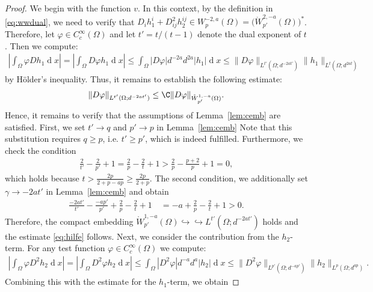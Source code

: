 \documentclass[12pt,a4paper,twoside]{article}
\newcommand{\diff}{\operatorname{d}\!}
\newcommand {\cb}[1] {\tikz[baseline=(char.base)]{
            \node[shape=circle,draw,inner sep=2pt] (char) {\itshape{\textbf{#1}}};}}
\newcommand {\cbm}[1] {\tikz[baseline=(char.base)]{
            \node[shape=circle,draw,inner sep=2pt] (char) {\scriptsize\itshape{\textbf{#1}}};}}
\begin{document}
\begin{proof}
\noindent\cb{1}
We begin with the function $v$.  In this context, by the definition in \eqref{eq:wwdual}, we need to verify that $D_ih^i_1+D^2_{ij}h^{ij}_2\in W^{-2,a}_p(\Omega)=\big(\mathring W^{2,-a}_{p'}(\Omega)\big)^\ast$. Therefore, let $\varphi\in C^\infty_c(\Omega)$ and let $t'=t/(t-1)$ denote the dual exponent of $t$. Then we compute:
\begin{align*}
 \left|\int_\Omega \varphi D h_1 \diff x\right|=  \left| \int_\Omega D \varphi h_1 \diff x \right|
 \le
 \int_\Omega |D \varphi| d^{- 2a } d^{2a} |h_1| \diff x 
    \le \|D \varphi  \|_{L^{t'}(\Omega; d^{-2at' })}  \| h_1  \|_{L^t(\Omega; d^{2at}) }
\end{align*}
by Hölder's inequality. Thus, it remains to establish the following estimate:
\begin{align}
    \|D \varphi  \|_{L^{t'}(\Omega; d^{-2at' })} \le  \C \|D \varphi  \|_{\mathring W^{1,-a}_{p'}(\Omega)}. \label{eq:hilfe}
\end{align}
Hence, it remains to verify that the assumptions of Lemma~\ref{lem:cemb} \cbm b are satisfied. First, we set $t'\to q$ and $p'\to p$ in Lemma~\ref{lem:cemb} \cbm b Note that this substitution requires $q\ge p$, i.e. $t' \ge p'$, which is indeed fulfilled.
Furthermore, we check the condition
\begin{align*}
    \frac{2}{t'}-\frac{2}{p'}+1 = \frac{2}{p}- \frac{2}{t} +1 > \frac{2}{p}-\frac{p+2}{p} +1 =0,
\end{align*}
which holds because $t>\frac{2p}{2+p-ap}\ge \frac{2p}{2+p} $. 
The second condition, we additionally set $\gamma\to -2at'$   in Lemma~\ref{lem:cemb} \cbm b and obtain
\begin{align*}
    \frac{-2at'}{t'}- \frac{-ap'}{p'}+ \frac{2}{p}- \frac{2}{t} +1 
    &\ = -a +\frac{2}{p}- \frac{2}{t} +1 > 0.
\end{align*}
Therefore, the compact embedding ${\mathring W^{1,-a}_{p'}(\Omega)}
 \hookrightarrow\hookrightarrow{L^{t'}(\Omega; d^{-2at' })}$ holds and the estimate \eqref{eq:hilfe} follows.  
Next, we consider the contribution from the $h_2$-term.  For any test function $\varphi\in C^\infty_c(\Omega)$ we compute:
\begin{align*}
 \left|\int_\Omega \varphi D^2 h_2 \diff x\right|=  \left| \int_\Omega D^2 \varphi h_2  \diff x \right|
 \le
 \int_\Omega |D^2 \varphi| d^{- a} d^{a} |h_2| \diff x 
    \le \|D^2 \varphi  \|_{L^{p'}(\Omega; d^{-ap' })}  \| h_2  \|_{L^p(\Omega; d^{a p}) }.
\end{align*}
Combining this with the estimate for the $h_1$-term, we obtain

\end{proof}
\end{document}
